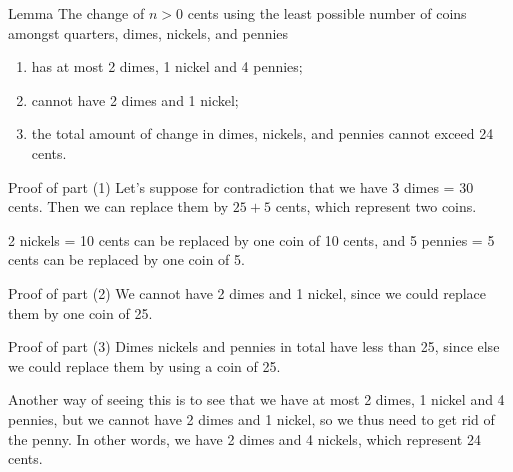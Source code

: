 \documentclass[a4paper]{article}
\begin{document}
\begin{parag}{Lemma}
     The change of $n > 0$ cents using the least possible number of coins amongst quarters, dimes, nickels, and pennies
    \begin{enumerate}
        \item has at most 2 dimes, 1 nickel and 4 pennies;
        \item cannot have 2 dimes and 1 nickel;
        \item the total amount of change in dimes, nickels, and pennies cannot exceed 24 cents.
    \end{enumerate}

    \begin{subparag}{Proof of part (1)}
        Let's suppose for contradiction that we have 3 dimes = 30 cents. Then we can replace them by $25 + 5$ cents, which represent two coins.

        2 nickels = 10 cents can be replaced by one coin of 10 cents, and 5 pennies = 5 cents can be replaced by one coin of 5.
    \end{subparag}

    \begin{subparag}{Proof of part (2)}
        We cannot have 2 dimes and 1 nickel, since we could replace them by one coin of 25.
    \end{subparag}

    \begin{subparag}{Proof of part (3)}
        Dimes nickels and pennies in total have less than 25, since else we could replace them by using a coin of 25.

        Another way of seeing this is to see that we have at most 2 dimes, 1 nickel and 4 pennies, but we cannot have 2 dimes and 1 nickel, so we thus need to get rid of the penny. In other words, we have 2 dimes and 4 nickels, which represent 24 cents.
    \end{subparag}



\end{parag}
\end{document}
